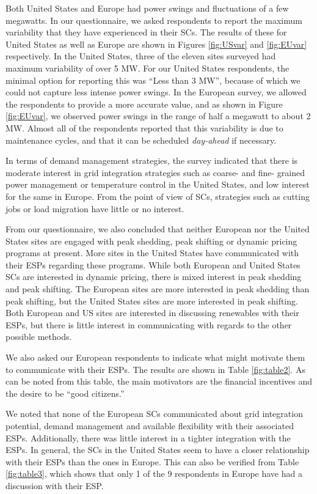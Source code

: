 Both United States and Europe had power swings and fluctuations of a few megawatts. In our questionnaire, we asked respondents to report the maximum variability that they have experienced in their SCs. The results of these for United States as well as Europe are shown in Figures \ref{fig:USvar} and \ref{fig:EUvar} respectively. In the United States, three of the eleven sites surveyed had maximum variability of over 5 MW. For our United States respondents, the minimal option for reporting this was ``Less than 3 MW'', because of which we could not capture less intense power swings. In the European survey, we allowed the respondents to provide a more accurate value, and as shown in Figure \ref{fig:EUvar}, we observed power swings in the range of half a megawatt to about 2 MW. Almost all of the respondents reported that this variability is due to maintenance cycles, and that it can be scheduled \emph{day-ahead} if necessary.

In terms of demand management strategies, the survey indicated that there is moderate interest in grid integration strategies such as coarse- and fine- grained power management or temperature control in the United States, and low interest for the same in Europe. From the point of view of SCs, strategies such as cutting jobs or load migration have little or no interest. 

From our questionnaire, we also concluded that neither European nor the United States sites are engaged with peak shedding, peak shifting or dynamic pricing programs at present. More sites in the United States have communicated with their ESPs regarding these programs. While both European and United States SCs are interested in dynamic pricing, there is mixed interest in peak shedding and peak shifting. The European sites are more interested in peak shedding than peak shifting, but the United States sites are more interested in peak shifting. Both European and US sites are interested in discussing renewables with their ESPs, but there is little interest in communicating with regards to the other possible methods.



We also asked our European respondents to indicate what might motivate them to communicate with their ESPs. The results are shown in Table \ref{fig:table2}. As can be noted from this table, the main motivators are the financial incentives and the desire to be ``good citizens.''


We noted that none of the European SCs communicated about grid integration potential, demand management and available flexibility with their associated ESPs. Additionally, there was little interest in a tighter integration with the ESPs. In general, the SCs in the United States seem to have a closer relationship with their ESPs than the ones in Europe. This can also be verified from Table \ref{fig:table3}, which shows that only 1 of the 9 respondents in Europe have had a discussion with their ESP. 


